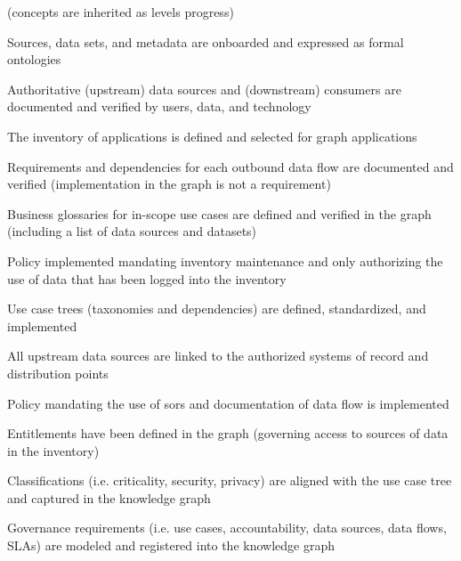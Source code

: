 \kgmmscoringsection

(concepts are inherited as levels progress)

\kgmmscoringlevelOne

\begin{scoring}

  \item Sources, data sets, and metadata are onboarded and expressed as formal ontologies
  \item Authoritative (upstream) data sources and (downstream) consumers are documented and verified by users,
        data, and technology
  \item The inventory of applications is defined and selected for graph applications
  \item Requirements and dependencies for each outbound data flow are documented and verified (implementation in the
        graph is not a requirement)
  \item Business glossaries for in-scope use cases are defined and verified in the graph (including a list of
        data sources and datasets)
  \item Policy implemented mandating inventory maintenance and only authorizing the use of data that has been logged
        into the inventory

\end{scoring}

\kgmmscoringlevelTwo

\begin{scoring}

  \item Use case trees (taxonomies and dependencies) are defined, standardized, and implemented
  \item All upstream data sources are linked to the authorized systems of record and distribution points
  \item Policy mandating the use of \glspl{sor} and documentation of data flow is implemented
  \item Entitlements have been defined in the graph (governing access to sources of data in the inventory)
  \item Classifications (i.e. criticality, security, privacy) are aligned with the use case tree and captured in the
        knowledge graph
  \item Governance requirements (i.e. use cases, accountability, data sources, data flows, SLAs) are modeled and
        registered into the knowledge graph

\end{scoring}

